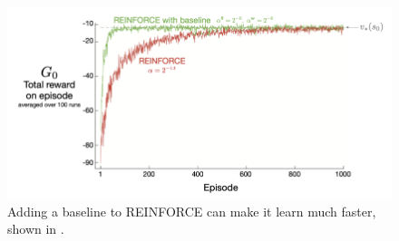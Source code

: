 \documentclass[11pt]{article}
\begin{document}
\begin{figure}[H]
    \centering
    \includegraphics[width = 0.7\linewidth]{2.PNG}
    \caption{Adding a baseline to REINFORCE can make it learn much faster, shown in \cite{sutton2018reinforcement}.}
    \label{fig:converge}
\end{figure}





\end{document}
